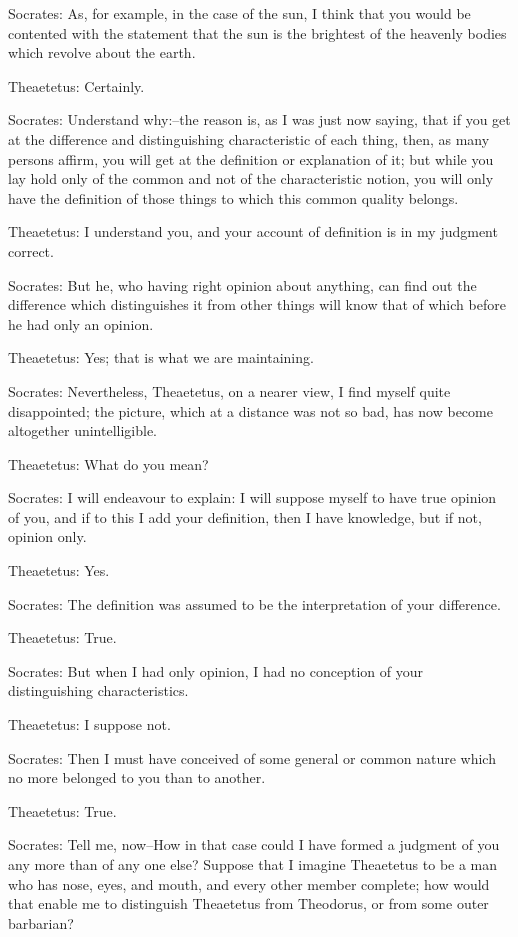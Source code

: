 Socrates: As, for example, in the case of the sun, I think that you
would be contented with the statement that the sun is the brightest of
the heavenly bodies which revolve about the earth.

Theaetetus: Certainly.

Socrates: Understand why:--the reason is, as I was just now saying, that
if you get at the difference and distinguishing characteristic of each
thing, then, as many persons affirm, you will get at the definition or
explanation of it; but while you lay hold only of the common and not of
the characteristic notion, you will only have the definition of those
things to which this common quality belongs.

Theaetetus: I understand you, and your account of definition is in my
judgment correct.

Socrates: But he, who having right opinion about anything, can find out
the difference which distinguishes it from other things will know that
of which before he had only an opinion.

Theaetetus: Yes; that is what we are maintaining.

Socrates: Nevertheless, Theaetetus, on a nearer view, I find myself
quite disappointed; the picture, which at a distance was not so bad, has
now become altogether unintelligible.

Theaetetus: What do you mean?

Socrates: I will endeavour to explain: I will suppose myself to have
true opinion of you, and if to this I add your definition, then I have
knowledge, but if not, opinion only.

Theaetetus: Yes.

Socrates: The definition was assumed to be the interpretation of your
difference.

Theaetetus: True.

Socrates: But when I had only opinion, I had no conception of your
distinguishing characteristics.

Theaetetus: I suppose not.

Socrates: Then I must have conceived of some general or common nature
which no more belonged to you than to another.

Theaetetus: True.

Socrates: Tell me, now--How in that case could I have formed a judgment
of you any more than of any one else? Suppose that I imagine Theaetetus
to be a man who has nose, eyes, and mouth, and every other member
complete; how would that enable me to distinguish Theaetetus from
Theodorus, or from some outer barbarian?

